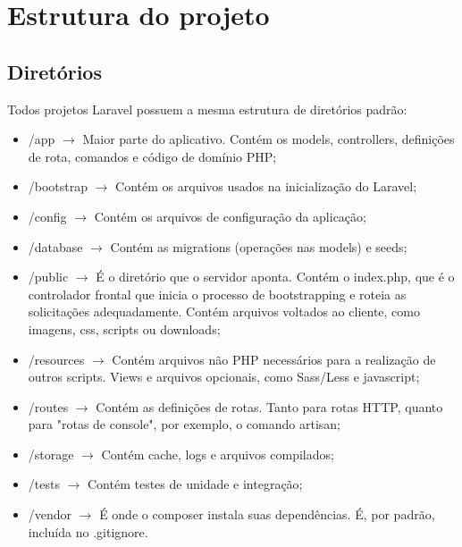 \documentclass[
12pt,				%
openany,			%
twoside,			%
a4paper,			%
english,			%
french,				%
spanish,			%
brazil,				%
]{abntex2}
\begin{document}
\section{Estrutura do projeto}

\subsection{Diretórios}
Todos projetos Laravel possuem a mesma estrutura de diretórios padrão:

\begin{itemize}
    \item /app $\rightarrow$ Maior parte do aplicativo. Contém os models, controllers, definições de rota, comandos e código de domínio PHP;

    \item /bootstrap $\rightarrow$ Contém os arquivos usados na inicialização do Laravel;

    \item /config $\rightarrow$ Contém os arquivos de configuração da aplicação;

    \item /database $\rightarrow$ Contém as migrations (operações nas models) e seeds;

    \item /public $\rightarrow$ É o diretório que o servidor aponta. Contém o index.php, que é o controlador frontal que inicia o processo de bootstrapping e roteia as solicitações adequadamente. Contém arquivos voltados ao cliente, como imagens, css, scripts ou downloads;

    \item /resources $\rightarrow$ Contém arquivos não PHP necessários para a realização de outros scripts. Views e arquivos opcionais, como Sass/Less e javascript;

    \item /routes $\rightarrow$ Contém as definições de rotas. Tanto para rotas HTTP, quanto para "rotas de console", por exemplo, o comando artisan;

    \item /storage $\rightarrow$ Contém cache, logs e arquivos compilados;

    \item /tests $\rightarrow$ Contém testes de unidade e integração;

    \item /vendor $\rightarrow$ É onde o composer instala suas dependências. É, por padrão, incluída no .gitignore.
\end{itemize}
\end{document}
